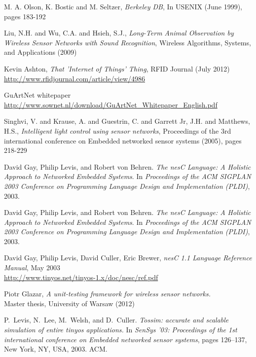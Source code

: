 \begin{thebibliography}{99}

M. A. Olson, K. Bostic and M. Seltzer,
\textit{Berkeley DB},
In USENIX (June 1999), pages 183-192

Liu, N.H. and Wu, C.A. and Hsieh, S.J.,
\textit{Long-Term Animal Observation by Wireless Sensor Networks with Sound Recognition},
Wireless Algorithms, Systems, and Applications (2009)

Kevin Ashton,
\textit{That 'Internet of Things' Thing},
RFID Journal (July 2012) \url{http://www.rfidjournal.com/article/view/4986}

GuArtNet whitepaper \url{http://www.sownet.nl/download/GuArtNet\_Whitepaper\_English.pdf}

Singhvi, V. and Krause, A. and Guestrin, C. and Garrett Jr, J.H. and Matthews, H.S.,
\textit{Intelligent light control using sensor networks},
Proceedings of the 3rd international conference on Embedded networked sensor systems (2005), pages 218-229

  David Gay, Philip Levis, and Robert von Behren.
  \textit{The nesC Language: A Holistic Approach
  to Networked Embedded Systems}.  \newblock In
  {\em Proceedings of the ACM SIGPLAN 2003
  Conference on Programming Language Design and
  Implementation (PLDI)}, 2003.

  David Gay, Philip Levis, and Robert von Behren.
  \textit{The nesC Language: A Holistic Approach
  to Networked Embedded Systems}.  \newblock In
  {\em Proceedings of the ACM SIGPLAN 2003
  Conference on Programming Language Design and
  Implementation (PLDI)}, 2003.

  David Gay, Philip Levis, David Culler, Eric Brewer,
  \textit{nesC 1.1 Language Reference Manual},
  May 2003 \\
  \url{http://www.tinyos.net/tinyos-1.x/doc/nesc/ref.pdf}


  Piotr Glazar, \textit{A unit-testing framework
  for wireless sensor networks.} \\ Master thesis,
  University of Warsaw (2012)

  P.~Levis, N.~Lee, M.~Welsh, and D.~Culler.
  \textit{Tossim: accurate and scalable
  simulation of entire tinyos applications.}
  \newblock In {\em SenSys '03: Proceedings of the
  1st international conference on Embedded
  networked sensor systems}, pages 126--137, New
  York, NY, USA, 2003. ACM.


\end{thebibliography}
